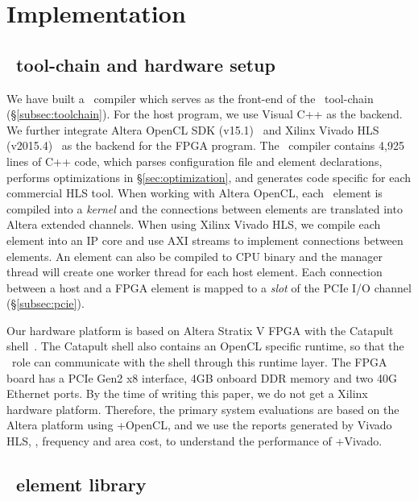 \section{Implementation}
\label{sec:impl}

\subsection{\name\ tool-chain and hardware setup}
We have built a \name\ compiler which serves as the front-end of the \name\ tool-chain (\S\ref{subsec:toolchain}).  
%
For the host program, we use Visual C++ as the backend. We further integrate Altera OpenCL SDK (v15.1)~\cite{aoc} and 
Xilinx Vivado HLS (v2015.4)~\cite{vivado} as the backend for the FPGA program.
%
The \name\ compiler contains 4,925 lines of C++ code, which parses configuration file and element declarations, 
performs optimizations in \S\ref{sec:optimization}, and generates code specific for each commercial HLS tool.
When working with Altera OpenCL, each \name\ element is compiled into a \textit{kernel} and 
the connections between elements are translated into Altera extended channels.
When using Xilinx Vivado HLS, we compile each element into an IP core and 
use AXI streams to implement connections between elements.
%
An element can also be compiled to CPU binary and the manager thread will create one worker thread for each host element.
%
Each connection between a host and a FPGA element is mapped to a \textit{slot} of the PCIe I/O 
channel (\S\ref{subsec:pcie}).

Our hardware platform is based on Altera Stratix V FPGA with the Catapult shell~\cite{putnam2014reconfigurable}.
The Catapult shell also contains an OpenCL specific runtime, so that the \name\ role can communicate with the shell 
through this runtime layer.
The FPGA board has a PCIe Gen2 x8 interface, 4GB onboard DDR memory and two 40G Ethernet ports. 
%
By the time of writing this paper, we do not get a Xilinx hardware platform. 
Therefore, the primary system evaluations are based on the Altera platform using \name+OpenCL, 
and we use the reports generated by Vivado HLS, \eg, frequency and area cost, to understand 
the performance of \name+Vivado.

\subsection{\name\ element library}
\label{subsec:lib}

